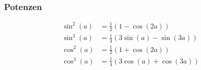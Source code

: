 \subsubsection{Potenzen}
\begin{align*}
	\sin^2(a) &= \frac{1}{2}(1 - \cos(2a)) \\
	\sin^3(a) &= \frac{1}{4}(3\sin(a) - \sin(3a)) \\
	\cos^2(a) &= \frac{1}{2}(1 + \cos(2a)) \\
	\cos^3(a) &= \frac{1}{4}(3\cos(a) + \cos(3a)) \\
\end{align*}
